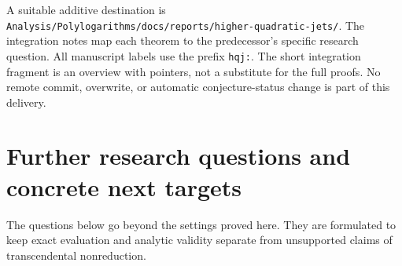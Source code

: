 \documentclass[11pt,letterpaper]{article}
\numberwithin{equation}{section}
\theoremstyle{definition}
\newcommand{\file}[1]{\nolinkurl{#1}}
\begin{document}
A suitable additive destination is
\file{Analysis/Polylogarithms/docs/reports/higher-quadratic-jets/}.
The integration notes map each theorem to the predecessor's specific
research question. All manuscript labels use the prefix \file{hqj:}.
The short integration fragment is an overview with pointers, not a
substitute for the full proofs. No remote commit, overwrite, or
automatic conjecture-status change is part of this delivery.


\section{Further research questions and concrete next targets}
\label{hqj:sec:research}

The questions below go beyond the settings proved here. They are
formulated to keep exact evaluation and analytic validity separate from
unsupported claims of transcendental nonreduction.
\end{document}
